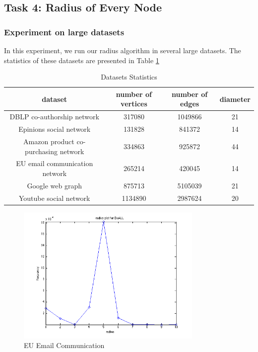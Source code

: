 \subsection{Task 4: Radius of Every Node}

\subsubsection{Experiment on large datasets}
In this experiment, we run our radius algorithm in several large datasets. The statistics of these datasets are presented in Table \ref{t4:table1}

\begin{table}[!htbf]
\caption{Datasets Statistics}
\begin{center}
\begin{tabular}{|c|c|c|c|}
\hline \hline
dataset & number of vertices & number of edges & diameter \\
\hline
DBLP co-authorship network & 317080  & 1049866  & 21  \\
Epinions social network & 131828  & 841372  & 14  \\
Amazon product co-purchasing network & 334863 & 925872 & 44 \\
EU email communication network & 265214 & 420045 & 14 \\
Google web graph & 875713 & 5105039 & 21 \\
Youtube social network & 1134890 & 2987624 & 20 \\
\hline
\end{tabular}
\end{center}
\label{t4:table1}
\end{table}%


\begin{figure}[!htbf]
\begin{center}
     \includegraphics[width=0.8\textwidth]{FIG/t4_email.png} 
\caption{EU Email Communication }
\label{t4:1}
\end{center}
\end{figure}

